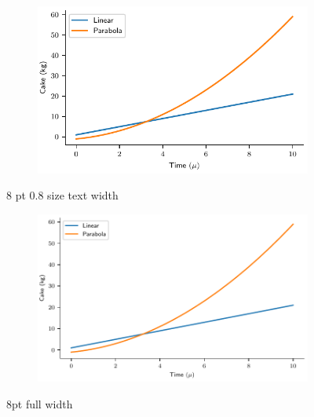 \documentclass[a4paper,11pt]{report}
\begin{document}
\begin{figure}
\centering
\begin{subfigure}{0.8\textwidth}
	\centering
	\includegraphics[width=1\linewidth]{fig/OneGoldenSmall.pdf}
\end{subfigure}
\caption{8 pt 0.8 size text width}
\end{figure}

\begin{figure}
\centering
\begin{subfigure}{0.99\textwidth}
	\centering
	\includegraphics[width=1\linewidth]{fig/OneGoldenFull.pdf}
\end{subfigure}
\caption{8pt full width}
\end{figure}
\end{document}
